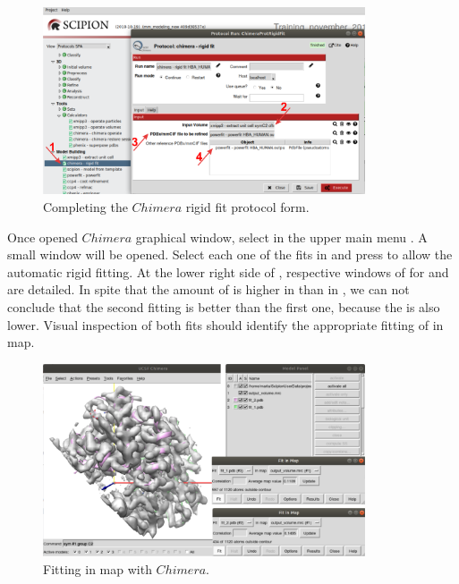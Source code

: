 \begin{itemize}
 \begin{figure}[H]
  \centering 
  \captionsetup{width=.7\linewidth} 
  \includegraphics[width=0.85\textwidth]{Images/Fig21.png}
  \caption{Completing the $Chimera$ rigid fit protocol form.}
  \label{fig:chimera_rigid_fit}
  \end{figure}
  
  Once opened $Chimera$ graphical window, select in the upper main menu . A small window will be opened. Select each one of the fits in  and press  to allow the automatic rigid fitting. At the lower right side of , respective windows of  for  and  are detailed. In spite that the amount of  is higher in  than in , we can not conclude that the second fitting is better than the first one, because the  is also lower. Visual inspection of both fits should identify the appropriate fitting of  in map.
  
  \begin{figure}[H]
  \centering 
  \captionsetup{width=.7\linewidth} 
  \includegraphics[width=0.85\textwidth]{Images/Fig22.png}
  \caption{Fitting in map with $Chimera$.}
  \label{fig:chimera_fit_in_map}
  \end{figure}
  

\end{itemize}
